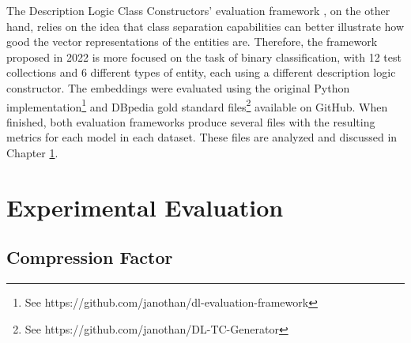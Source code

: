 \documentclass[11pt,titlepage,oneside,openany]{book}
\begin{document}
The Description Logic Class Constructors' evaluation framework \cite{portisch_dlcc_2022}, on the other hand, relies on the idea that class separation capabilities can better illustrate how good the vector representations of the entities are. Therefore, the framework proposed in 2022 is more focused on the task of binary classification, with 12 test collections and 6 different types of entity, each using a different description logic constructor. The embeddings were evaluated using the original Python implementation\footnote{See https://github.com/janothan/dl-evaluation-framework} and DBpedia gold standard files\footnote{See https://github.com/janothan/DL-TC-Generator} available on GitHub. When finished, both evaluation frameworks produce several files with the resulting metrics for each model in each dataset. These files are analyzed and discussed in Chapter \ref{cha:exp}.


\chapter{Experimental Evaluation}
\label{cha:exp}

\section{Compression Factor}
\label{sec:exp-overview}
\end{document}
